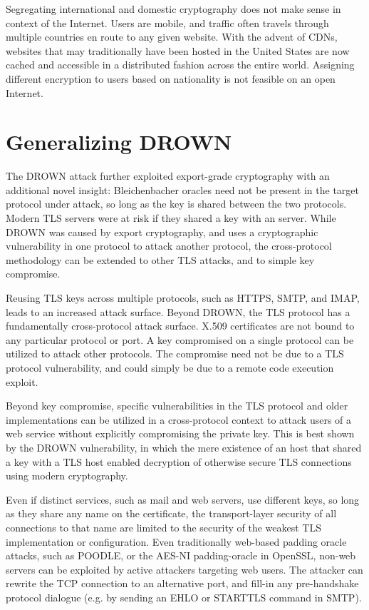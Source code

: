 Segregating international and domestic cryptography does not make sense in
context of the Internet. Users are mobile, and traffic often travels through
multiple countries en route to any given website. With the advent of CDNs,
websites that may traditionally have been hosted in the United States are now
cached and accessible in a distributed fashion across the entire world.
Assigning different encryption to users based on nationality is not feasible
on an open Internet.

\section{Generalizing DROWN}

The DROWN attack further exploited export-grade cryptography with an
additional novel insight: Bleichenbacher oracles need not be present in the
target protocol under attack, so long as the key is shared between the two
protocols. Modern TLS servers were at risk if they shared a key with an
\ssltwo server. While DROWN was caused by export cryptography, and uses a
cryptographic vulnerability in one protocol to attack another protocol, the
cross-protocol methodology can be extended to other TLS attacks, and to
simple key compromise.

Reusing TLS keys across multiple protocols, such as HTTPS, SMTP, and IMAP,
leads to an increased attack surface. Beyond DROWN, the TLS protocol has a
fundamentally cross-protocol attack surface. X.509 certificates are not bound
to any particular protocol or port. A key compromised on a single protocol
can be utilized to attack other protocols. The compromise need not be due to
a TLS protocol vulnerability, and could simply be due to a remote code
execution exploit. 

Beyond key compromise, specific vulnerabilities in the TLS protocol and older
implementations can be utilized in a cross-protocol context to attack users
of a web service without explicitly compromising the private key. This is
best shown by the DROWN vulnerability, in which the mere existence of an
\ssltwo host that shared a key with a TLS host enabled decryption of
otherwise secure TLS connections using modern cryptography.

Even if distinct services, such as mail and web servers, use
different keys, so long as they share any name on the certificate, the
transport-layer security of all connections to that name are limited to the
security of the weakest TLS implementation or configuration. Even traditionally
web-based padding oracle attacks, such as POODLE, or the AES-NI padding-oracle
in OpenSSL, non-web servers can be exploited by active attackers targeting web
users. The attacker can rewrite the TCP connection to an alternative port, and
fill-in any pre-handshake protocol dialogue (e.g. by sending an EHLO or
STARTTLS command in SMTP).

